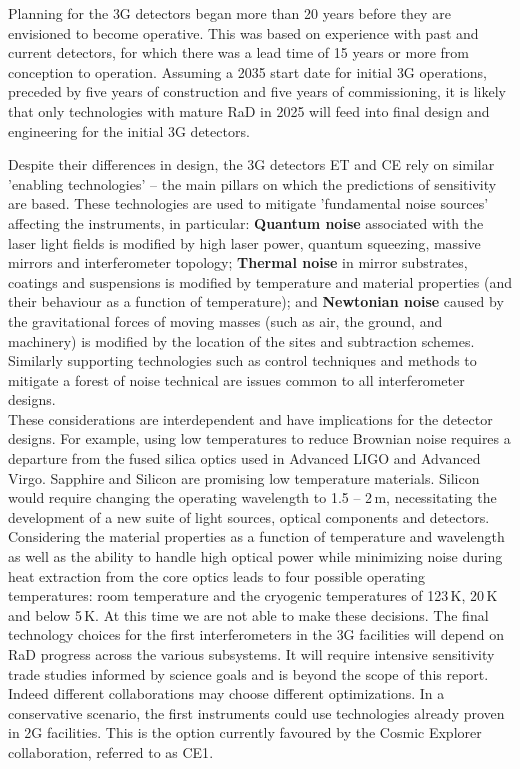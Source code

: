 Planning for the \ac{3G} detectors began more than 20 years before they are envisioned to become operative. This was based on experience with past and current detectors, for which there was a lead time of 15 years or more from conception to operation. Assuming a 2035 start date for initial \ac{3G} operations, preceded by five years of construction and five years of commissioning, it is likely that only technologies with mature \ac{RaD} in 2025 will feed into final design and engineering for the initial \ac{3G} detectors. 

Despite their differences in design, the \ac{3G} detectors \ac{ET} and \ac{CE} rely on similar 'enabling technologies' -- the main pillars on which the predictions of sensitivity are based. These technologies are used to mitigate 'fundamental noise sources' affecting the instruments, in particular: \textbf{Quantum noise} associated with the laser light fields is modified by high laser power, quantum squeezing, massive mirrors and interferometer topology; \textbf{Thermal noise} in mirror substrates, coatings and suspensions is modified by temperature and material properties (and their behaviour as a function of temperature); and \textbf{Newtonian noise} caused by the gravitational forces of moving masses (such as air, the ground, and machinery) is modified by the location of the sites and subtraction schemes.  Similarly supporting technologies such as control techniques and methods to  mitigate  a forest of noise technical  are issues common to all interferometer designs.\\
These considerations are interdependent and have implications for the detector designs. For example, using low temperatures to reduce Brownian noise requires a departure from the fused silica optics used in Advanced LIGO and Advanced Virgo. Sapphire and Silicon are promising low temperature materials. Silicon would require changing the operating wavelength to 1.5 -- 2\,\micro m, necessitating the development of a new suite of light sources, optical components and detectors. Considering the material properties as a function of temperature and wavelength as well as the ability to handle high optical power while minimizing noise during heat extraction from the core optics leads to four possible operating temperatures: room temperature and the cryogenic temperatures of 123\,K, 20\,K and below 5\,K.  At this time we are not able to make these decisions. The final technology choices for the first interferometers in the \ac{3G} facilities will depend on \ac{RaD} progress across the various subsystems.  It  will require intensive sensitivity trade studies informed by science goals and is beyond the scope of this report.  Indeed different collaborations  may choose different optimizations.   In a conservative scenario, the first instruments could use technologies already proven in  \ac{2G} facilities.  This is the option currently favoured by the Cosmic Explorer collaboration, referred to as \acs{CE1}.





